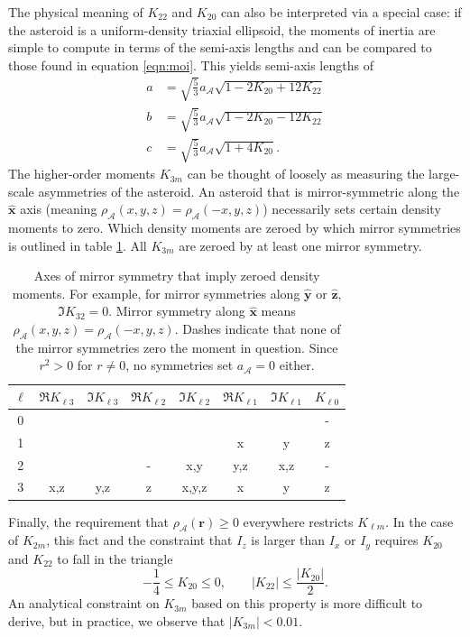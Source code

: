 \documentclass[fleqn,usenatbib]{mnras}
\newcommand{\unit}[1]{\bm{\hat{#1}}}
\begin{document}
The physical meaning of $K_{22}$ and $K_{20}$ can also be interpreted via a special case: if the asteroid is a uniform-density triaxial ellipsoid, the moments of inertia are simple to compute in terms of the semi-axis lengths and can be compared to those found in equation \ref{eqn:moi}. This yields semi-axis lengths of 
\begin{equation}
  \begin{split}
  a &= \sqrt{\frac{5}{3}}a_\mathcal{A}\sqrt{1-2K_{20}+12K_{22}}\\
  b &= \sqrt{\frac{5}{3}}a_\mathcal{A}\sqrt{1-2K_{20}-12K_{22}}\\
  c &= \sqrt{\frac{5}{3}}a_\mathcal{A}\sqrt{1+4K_{20}}.
  \label{eqn:ellipsoid-axes}
  \end{split}
\end{equation}
The higher-order moments $K_{3m}$ can be thought of loosely as measuring the large-scale asymmetries of the asteroid. An asteroid that is mirror-symmetric along the $\unit{x}$ axis (meaning $\rho_\mathcal{A}(x,y,z)=\rho_\mathcal{A}(-x,y,z)$) necessarily sets certain density moments to zero. Which density moments are zeroed by which mirror symmetries is outlined in table \ref{tab:klm-symmetries}. All $K_{3m}$ are zeroed by at least one mirror symmetry. 

\begin{table}
  \centering
  \begin{tabular}{c|ccccccc}
    \hline
    $\ell$ & $\Re K_{\ell 3}$ & $\Im K_{\ell 3}$ & $\Re K_{\ell 2}$ & $\Im K_{\ell 2}$ & $\Re K_{\ell 1}$ & $\Im K_{\ell 1}$ & $K_{\ell 0}$ \\ \hline
    0 &  &  &  &  &  &  & -\\ 
    1 &  &  &  &  & x & y & z\\ 
    2 &  &  & - & x,y & y,z & x,z & -\\ 
    3 & x,z & y,z & z & x,y,z & x & y & z\\ \hline
  \end{tabular}
  \caption{Axes of mirror symmetry that imply zeroed density moments. For example, for mirror symmetries along $\unit y$ or $\unit z$, $\Im K_{32}=0$. Mirror symmetry along $\unit x$ means $\rho_\mathcal{A}(x, y, z) = \rho_\mathcal{A}(-x, y, z)$. Dashes indicate that none of the mirror symmetries zero the moment in question. Since $r^2>0$ for $r\neq 0$, no symmetries set $a_\mathcal{A}=0$ either.}
  \label{tab:klm-symmetries}
\end{table} 

Finally, the requirement that $\rho_\mathcal{A}(\bm r) \geq 0$ everywhere restricts $K_{\ell m}$. In the case of $K_{2m}$, this fact and the constraint that $I_z$ is larger than $I_x$ or $I_y$ requires $K_{20}$ and $K_{22}$ to fall in the triangle
\begin{equation}
  -\frac{1}{4} \leq K_{20} \leq 0, \qquad |K_{22}| \leq \frac{|K_{20}|}{2}.
  \label{eqn:parameter-bounds}
\end{equation}
An analytical constraint on $K_{3m}$ based on this property is more difficult to derive, but in practice, we observe that $|K_{3m}| < 0.01$.
\end{document}
